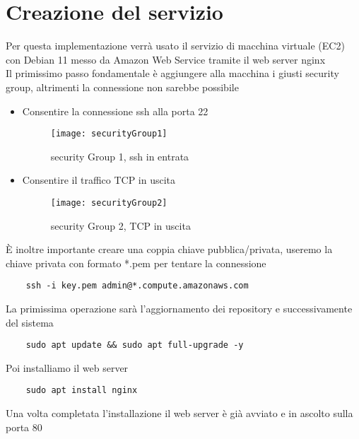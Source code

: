 \section{Creazione del servizio}

Per questa implementazione verrà usato il servizio di macchina virtuale (EC2) con Debian 11 messo da Amazon Web Service tramite il web server nginx \\
Il primissimo passo fondamentale è aggiungere alla macchina i giusti security group, altrimenti la connessione non sarebbe possibile


\begin{itemize}
    \item Consentire la connessione ssh alla porta 22
    \begin{figure}[h]
        \centering
        \texttt{[image: securityGroup1]}
        \caption{security Group 1, ssh in entrata}
        \label{fig:sec1}
    \end{figure}
    
    \item Consentire il traffico TCP in uscita
    \begin{figure}[h]
        \centering
        \texttt{[image: securityGroup2]}
        \caption{security Group 2, TCP in uscita}
        \label{fig:sec2}
    \end{figure}
\end{itemize}

È inoltre importante creare una coppia chiave pubblica/privata, useremo la chiave privata con formato *.pem per tentare la connessione
\begin{lstlisting}
    ssh -i key.pem admin@*.compute.amazonaws.com
\end{lstlisting}

La primissima operazione sarà l'aggiornamento dei repository e successivamente del sistema
\begin{lstlisting}
    sudo apt update && sudo apt full-upgrade -y
\end{lstlisting}

Poi installiamo il web server
\begin{lstlisting}
    sudo apt install nginx
\end{lstlisting}

Una volta completata l'installazione il web server è già avviato e in ascolto sulla porta 80

